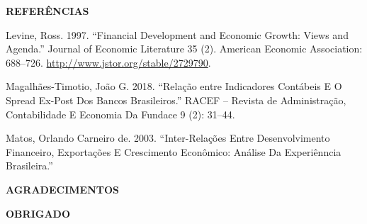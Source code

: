 \documentclass[ignorenonframetext,aspectratio=169,ignorenonframetext]{beamer}
\begin{document}
\begin{frame}{\textbf{REFERÊNCIAS}}
\protect\hypertarget{referuxeancias-2}{}

Levine, Ross. 1997. ``Financial Development and Economic Growth: Views
and Agenda.'' Journal of Economic Literature 35 (2). American Economic
Association: 688--726. \url{http://www.jstor.org/stable/2729790}.

Magalhães-Timotio, João G. 2018. ``Relação entre Indicadores Contábeis E
O Spread Ex-Post Dos Bancos Brasileiros.'' RACEF -- Revista de
Administração, Contabilidade E Economia Da Fundace 9 (2): 31--44.

Matos, Orlando Carneiro de. 2003. ``Inter-Relações Entre Desenvolvimento
Financeiro, Exportações E Crescimento Econômico: Análise Da Experiênncia
Brasileira.''

\end{frame}

\begin{frame}{\textbf{AGRADECIMENTOS}}
\protect\hypertarget{agradecimentos}{}

\textbf{OBRIGADO}

\end{frame}
\end{document}
